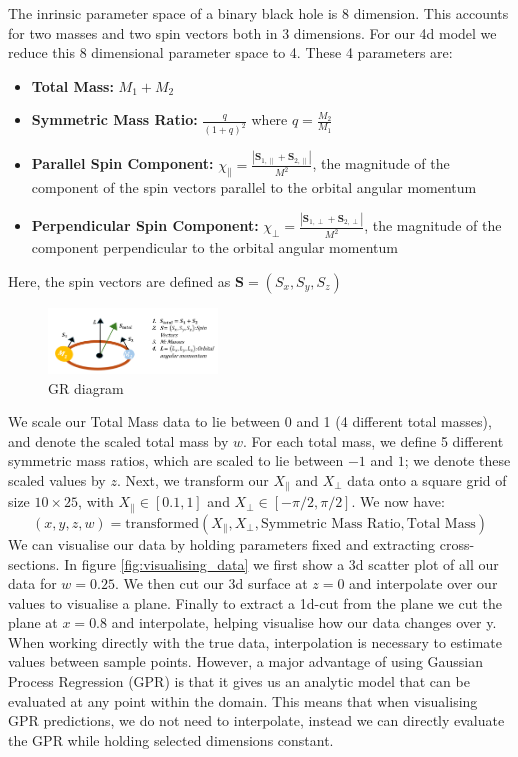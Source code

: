 \documentclass{article}
\begin{document}
\noindent
The inrinsic parameter space of a binary black hole is 8 dimension. This accounts for two masses and two spin vectors both in 3 dimensions. 
For our 4d model we reduce this 8 dimensional parameter space to 4. These 4 parameters are:
\begin{itemize}
    \item \textbf{Total Mass:} $M_1 + M_2$
    \item \textbf{Symmetric Mass Ratio:} $\displaystyle \frac{q}{(1+q)^2}$ where $q = \frac{M_2}{M_1}$
    \item \textbf{Parallel Spin Component:} $\displaystyle \chi_{\parallel} = \frac{|\mathbf{S}_{1,\parallel} + \mathbf{S}_{2,\parallel}|}{M^2}$, the magnitude of the component of the spin vectors parallel to the orbital angular momentum
    \item \textbf{Perpendicular Spin Component:} $\displaystyle \chi_{\perp} = \frac{|\mathbf{S}_{1,\perp} + \mathbf{S}_{2,\perp}|}{M^2}$, the magnitude of the component perpendicular to the orbital angular momentum
\end{itemize}
Here, the spin vectors are defined as $\mathbf{S} = (S_x, S_y, S_z)$

\begin{figure}[H]
    \centering
    \includegraphics[width=0.4\textwidth]{LatexPlots/GRdiagram.png}
    \caption{GR diagram}
    \label{fig:gr_diagram}
\end{figure}
\noindent
We scale our Total Mass data to lie between 0 and 1 (4 different total masses), and denote the scaled total mass by \( w \). For each total mass, we define 5 different symmetric mass ratios, which are scaled to lie between \(-1\) and \(1\); we denote these scaled values by \( z \).
Next, we transform our \( X_{\parallel} \) and \( X_{\perp} \) data onto a square grid of size \( 10 \times 25 \), with \( X_{\parallel} \in [0.1, 1] \) and \( X_{\perp} \in [-\pi/2, \pi/2] \).
We now have:
\begin{equation}
(x, y, z, w) = \text{transformed}(X_{\parallel}, X_{\perp}, \text{Symmetric Mass Ratio}, \text{Total Mass})
\end{equation}
\noindent
We can visualise our data by holding parameters fixed and extracting cross-sections. In figure \ref{fig:visualising_data} we first show a 3d scatter plot of all our data for $w = 0.25$. We then 
cut our 3d surface at $z=0$ and interpolate over our values to visualise a plane. Finally to extract a 1d-cut from the plane we cut the plane at $x=0.8$ and interpolate, helping visualise how our data changes over y. 
When working directly with the true data, interpolation is necessary to estimate values between sample points. However, a major advantage of using Gaussian Process Regression (GPR) is that it gives us an analytic model that can be evaluated at any point within the domain. 
This means that when visualising GPR predictions, we do not need to interpolate, instead we can directly evaluate the GPR while holding selected dimensions constant.
\end{document}
